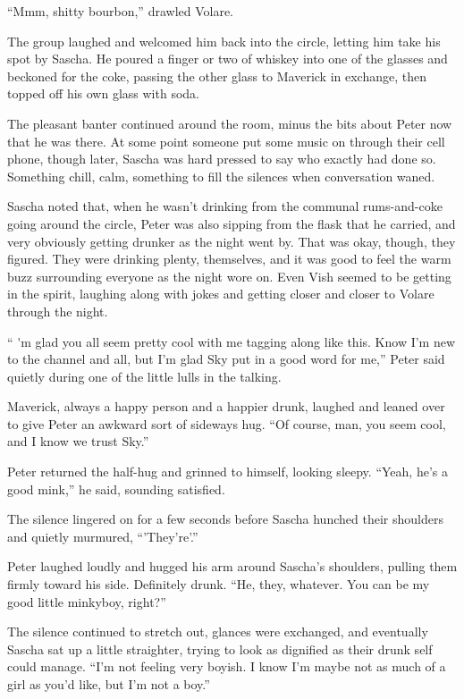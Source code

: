 ``Mmm, shitty bourbon,'' drawled Volare.

The group laughed and welcomed him back into the circle, letting him take his spot by Sascha. He poured a finger or two of whiskey into one of the glasses and beckoned for the coke, passing the other glass to Maverick in exchange, then topped off his own glass with soda.

The pleasant banter continued around the room, minus the bits about Peter now that he was there. At some point someone put some music on through their cell phone, though later, Sascha was hard pressed to say who exactly had done so. Something chill, calm, something to fill the silences when conversation waned.

Sascha noted that, when he wasn't drinking from the communal rums-and-coke going around the circle, Peter was also sipping from the flask that he carried, and very obviously getting drunker as the night went by. That was okay, though, they figured. They were drinking plenty, themselves, and it was good to feel the warm buzz surrounding everyone as the night wore on. Even Vish seemed to be getting in the spirit, laughing along with jokes and getting closer and closer to Volare through the night.

`` \'{}m glad you all seem pretty cool with me tagging along like this. Know I'm new to the channel and all, but I'm glad Sky put in a good word for me,'' Peter said quietly during one of the little lulls in the talking.

Maverick, always a happy person and a happier drunk, laughed and leaned over to give Peter an awkward sort of sideways hug. ``Of course, man, you seem cool, and I know we trust Sky.''

Peter returned the half-hug and grinned to himself, looking sleepy. ``Yeah, he's a good mink,'' he said, sounding satisfied.

The silence lingered on for a few seconds before Sascha hunched their shoulders and quietly murmured, ``'They're'.''

Peter laughed loudly and hugged his arm around Sascha's shoulders, pulling them firmly toward his side. Definitely drunk. ``He, they, whatever. You can be my good little minkyboy, right?''

The silence continued to stretch out, glances were exchanged, and eventually Sascha sat up a little straighter, trying to look as dignified as their drunk self could manage. ``I'm not feeling very boyish. I know I'm maybe not as much of a girl as you'd like, but I'm not a boy.''

